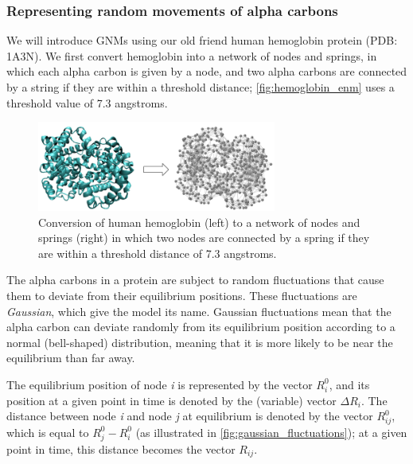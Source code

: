 \FloatBarrier
{}
\subsubsection{Representing random movements of alpha carbons}

We will introduce GNMs using our old friend human hemoglobin protein (PDB: 1A3N). We first convert hemoglobin into a network of nodes and springs, in which each alpha carbon is given by a node, and two alpha carbons are connected by a string if they are within a threshold distance; \autoref{fig:hemoglobin_enm} uses a threshold value of 7.3 angstroms.

\begin{figure}[h]
	\centering
	\mySfFamily
	\includegraphics[width = 0.7\textwidth]{../images/hemoglobin_enm.png}
	\caption{Conversion of human hemoglobin (left) to a network of nodes and springs (right) in which two nodes are connected by a spring if they are within a threshold distance of 7.3 angstroms.}
	\label{fig:hemoglobin_enm}
\end{figure}

The alpha carbons in a protein are subject to random fluctuations that cause them to deviate from their equilibrium positions. These fluctuations are \textit{Gaussian}, which give the model its name. Gaussian fluctuations mean that the alpha carbon can deviate randomly from its equilibrium position according to a normal (bell-shaped) distribution, meaning that it is more likely to be near the equilibrium than far away.

The equilibrium position of node \textit{i} is represented by the vector $ R_i^0 $, and its position at a given point in time is denoted by the (variable) vector $ \Delta R_i $. The distance between node \textit{i} and node \textit{j} at equilibrium is denoted by the vector $ R_{ij}^0 $, which is equal to $ R_j^0 - R_i^0 $ (as illustrated in \autoref{fig:gaussian_fluctuations}); at a given point in time, this distance becomes the vector $ R_{ij} $.

